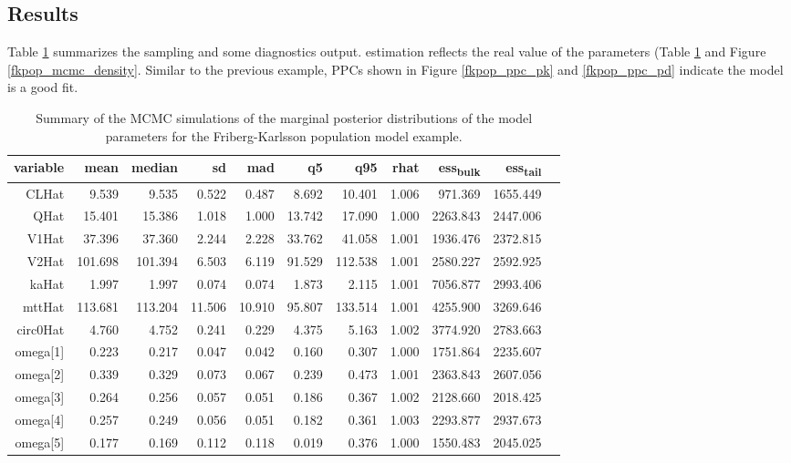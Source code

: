 \documentclass[12pt, reqno, oneside]{amsbook}
\numberwithin{equation}{chapter}
\numberwithin{figure}{chapter}
\numberwithin{table}{chapter}
\theoremstyle{remark}
\begin{document}
\subsection{Results}
\label{sec:orgecf35b4}
Table \ref{FkpopModelParms} summarizes the sampling and some diagnostics output.
estimation reflects the real value of the parameters (Table \ref{FkpopModelParms} and Figure \ref{fkpop_mcmc_density}.
Similar to the previous example, PPCs shown in Figure \ref{fkpop_ppc_pk}
and \ref{fkpop_ppc_pd} indicate the model is a good fit.

\begin{table}[htbp]
\caption{\label{FkpopModelParms}Summary of the MCMC simulations of the marginal posterior distributions of the model parameters for the Friberg-Karlsson population model example.}
\centering
\footnotesize
\begin{tabular}{r r r r r r r r r r r}
variable & mean & median & sd & mad & q5 & q95 & rhat & ess\textsubscript{bulk} & ess\textsubscript{tail}\\
\hline
CLHat & 9.539 & 9.535 & 0.522 & 0.487 & 8.692 & 10.401 & 1.006 & 971.369 & 1655.449\\
QHat & 15.401 & 15.386 & 1.018 & 1.000 & 13.742 & 17.090 & 1.000 & 2263.843 & 2447.006\\
V1Hat & 37.396 & 37.360 & 2.244 & 2.228 & 33.762 & 41.058 & 1.001 & 1936.476 & 2372.815\\
V2Hat & 101.698 & 101.394 & 6.503 & 6.119 & 91.529 & 112.538 & 1.001 & 2580.227 & 2592.925\\
kaHat & 1.997 & 1.997 & 0.074 & 0.074 & 1.873 & 2.115 & 1.001 & 7056.877 & 2993.406\\
mttHat & 113.681 & 113.204 & 11.506 & 10.910 & 95.807 & 133.514 & 1.001 & 4255.900 & 3269.646\\
circ0Hat & 4.760 & 4.752 & 0.241 & 0.229 & 4.375 & 5.163 & 1.002 & 3774.920 & 2783.663\\
omega[1] & 0.223 & 0.217 & 0.047 & 0.042 & 0.160 & 0.307 & 1.000 & 1751.864 & 2235.607\\
omega[2] & 0.339 & 0.329 & 0.073 & 0.067 & 0.239 & 0.473 & 1.001 & 2363.843 & 2607.056\\
omega[3] & 0.264 & 0.256 & 0.057 & 0.051 & 0.186 & 0.367 & 1.002 & 2128.660 & 2018.425\\
omega[4] & 0.257 & 0.249 & 0.056 & 0.051 & 0.182 & 0.361 & 1.003 & 2293.877 & 2937.673\\
omega[5] & 0.177 & 0.169 & 0.112 & 0.118 & 0.019 & 0.376 & 1.000 & 1550.483 & 2045.025\\

\end{tabular}
\end{table}
\end{document}
